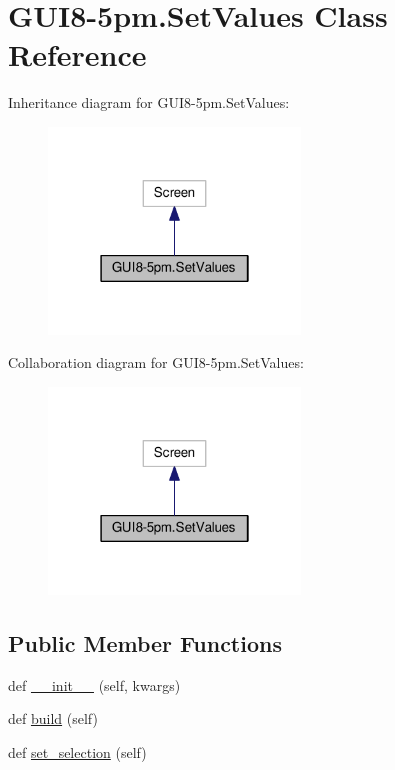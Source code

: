 \hypertarget{classGUI8-5pm_1_1SetValues}{}\section{G\+U\+I8-\/5pm.Set\+Values Class Reference}
\label{classGUI8-5pm_1_1SetValues}


Inheritance diagram for G\+U\+I8-\/5pm.Set\+Values\+:
\nopagebreak
\begin{figure}[H]
\begin{center}
\leavevmode
\includegraphics[width=190pt]{classGUI8-5pm_1_1SetValues__inherit__graph}
\end{center}
\end{figure}


Collaboration diagram for G\+U\+I8-\/5pm.Set\+Values\+:
\nopagebreak
\begin{figure}[H]
\begin{center}
\leavevmode
\includegraphics[width=190pt]{classGUI8-5pm_1_1SetValues__coll__graph}
\end{center}
\end{figure}
\subsection*{Public Member Functions}
\begin{DoxyCompactItemize}
\item 
def \hyperlink{classGUI8-5pm_1_1SetValues_afe186284aaf655e182eb4a0db6ad88c2}{\+\_\+\+\_\+init\+\_\+\+\_\+} (self, kwargs)
\item 
def \hyperlink{classGUI8-5pm_1_1SetValues_a439aa024ea8ca42f77bb95c0fd031f6b}{build} (self)
\item 
def \hyperlink{classGUI8-5pm_1_1SetValues_a1b4d3278b51b233ef6be6648162cb5ca}{set\+\_\+selection} (self)
\end{DoxyCompactItemize}
